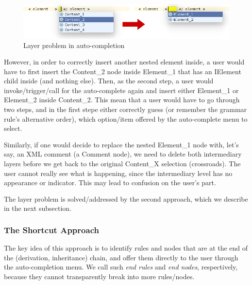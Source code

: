 \documentclass[10pt]{sigplanconf}
\newcommand{\mpsconcept}[1]{\textcolor{mpsconceptcolor}{#1}}
\newcommand{\mpsinterface}[1]{\textcolor{mpsinterfacecolor}{#1}}
\begin{document}
\begin{figure}[ht]
	\centering
	\includegraphics[scale=0.5]{./images/layer_problem.png}
	\caption{Layer problem in auto-completion}
	\label{fig:layer_problem}
\end{figure}

However, in order to correctly insert another nested element inside, a user would have to first insert the \mpsconcept{Content{\_}2} node inside \mpsconcept{Element{\_}1} that has an \mpsinterface{IElement} child inside (and nothing else).
Then, as the second step, a user would invoke/trigger/call for the auto-complete again and insert either \mpsconcept{Element{\_}1} or \mpsconcept{Element{\_}2} inside \mpsconcept{Content{\_}2}.
This mean that a user would have to go through two steps, and in the first stepe either correctly guess (or remember the grammar rule's alternative order), which option/item offered by the auto-complete menu to select.

Similarly, if one would decide to replace the nested \mpsconcept{Element{\_}1} node with, let's say, an XML comment (a \mpsconcept{Comment} node), we need to delete both intermediary layers before we get back to the original \mpsconcept{Content{\_}X} selection (crossroads).
The user cannot really see what is happening, since the intermediary level has no appearance or indicator.
This may lead to confusion on the user's part.

The layer problem is solved/addressed by the second approach, which we describe in the next subsection.

\subsubsection{The Shortcut Approach}
\label{sect:shortcut_approach}

The key idea of this approach is to identify rules and nodes that are at the end of the (derivation, inheritance) chain, and offer them directly to the user through the auto-completion menu.
We call such \emph{end rules} and \emph{end nodes}, respectively, because they cannot transparently break into more rules/nodes.
\end{document}
